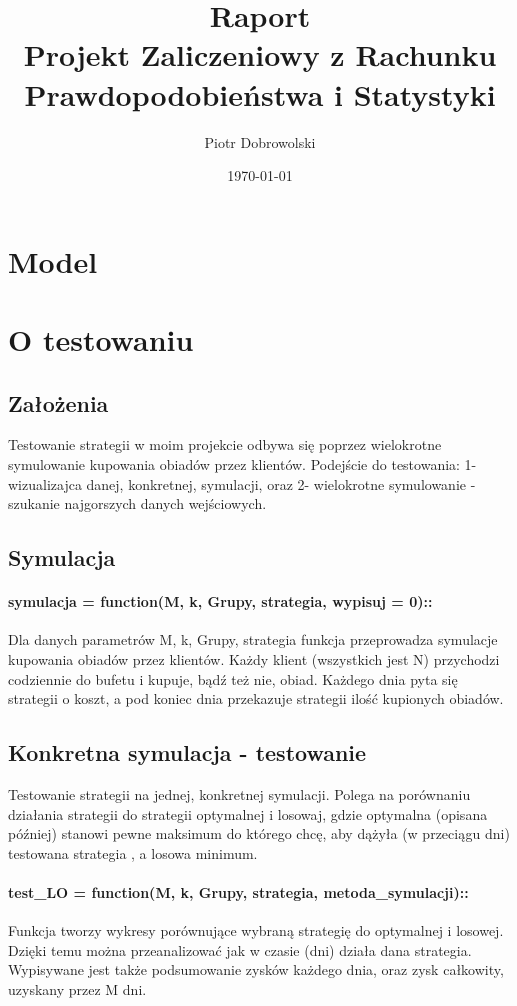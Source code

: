 \documentclass{article}
\author{Piotr Dobrowolski}
\title{Raport \\{\small Projekt Zaliczeniowy z Rachunku Prawdopodobieństwa i Statystyki} }
\date{\today}
\begin{document}
\maketitle
\tableofcontents
\section{Model}
\section{O testowaniu}
\subsection{Założenia}
Testowanie strategii w moim projekcie odbywa się poprzez wielokrotne symulowanie kupowania
obiadów przez klientów. Podejście do testowania: 1-wizualizajca danej, konkretnej, symulacji, oraz 2-
wielokrotne symulowanie - szukanie najgorszych danych wejściowych.
\subsection{Symulacja}
\paragraph{symulacja = function(M, k, Grupy, strategia, wypisuj = 0)::} Dla danych parametrów M, k, Grupy, strategia
funkcja przeprowadza symulacje kupowania obiadów przez klientów. Każdy klient (wszystkich jest N) przychodzi codziennie
do bufetu i kupuje, bądź też nie, obiad. Każdego dnia pyta się strategii o koszt, a pod koniec dnia przekazuje
strategii ilość kupionych obiadów.
\subsection{Konkretna symulacja - testowanie}
Testowanie strategii na jednej, konkretnej symulacji. Polega na porównaniu działania strategii do strategii optymalnej
i losowaj, gdzie optymalna (opisana później) stanowi pewne maksimum do którego chcę, aby dążyła (w przeciągu dni) testowana strategia
, a losowa minimum. 
\paragraph{test\_LO = function(M, k, Grupy, strategia, metoda\_symulacji)::} Funkcja tworzy wykresy porównujące wybraną
strategię do optymalnej i losowej. Dzięki temu można przeanalizować jak w czasie (dni) działa dana strategia. Wypisywane jest także
podsumowanie zysków każdego dnia, oraz zysk całkowity, uzyskany przez M dni.
\end{document}
